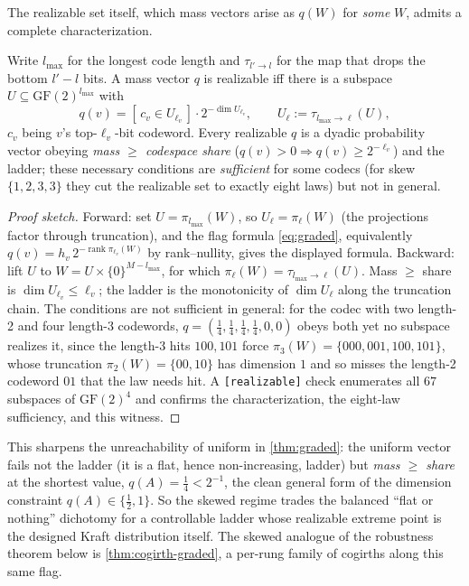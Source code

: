 \documentclass[acmsmall,review]{acmart}
\newcommand{\GF}{\mathrm{GF}(2)}
\DeclareMathOperator{\rank}{rank}
\newcommand{\W}{W}                          %
\newcommand{\proj}{\pi}                     %
\begin{document}
The realizable set itself, which mass vectors arise as $q(\W)$ for \emph{some} $\W$, admits
a complete characterization.

\begin{theorem}
\label{thm:realizable}
Write $l_{\max}$ for the longest code length and $\tau_{l' \to l}$ for the map that drops the
bottom $l' - l$ bits. A mass vector $q$ is realizable iff there is a subspace $U \subseteq
\GF^{l_{\max}}$ with
\[
  q(v) = [\, c_v \in U_{\ell_v} \,] \cdot 2^{-\dim U_{\ell_v}},
  \qquad U_\ell := \tau_{l_{\max} \to \ell}(U),
\]
$c_v$ being $v$'s top-$\ell_v$-bit codeword. Every realizable $q$ is a dyadic probability
vector obeying \emph{mass $\ge$ codespace share} ($q(v) > 0 \Rightarrow q(v) \ge 2^{-\ell_v}$)
and the ladder; these necessary conditions are \emph{sufficient} for some codecs (for skew
$\{1,2,3,3\}$ they cut the realizable set to exactly eight laws) but not in general.
\end{theorem}

\begin{proof}[Proof sketch]
Forward: set $U = \proj_{l_{\max}}(\W)$, so $U_\ell = \proj_\ell(\W)$ (the projections factor
through truncation), and the flag formula \eqref{eq:graded}, equivalently $q(v) = h_v\,
2^{-\rank \proj_{\ell_v}(\W)}$ by rank--nullity, gives the displayed formula.
Backward: lift $U$ to $\W = U \times \{0\}^{M - l_{\max}}$, for which $\proj_\ell(\W) =
\tau_{l_{\max} \to \ell}(U)$. Mass $\ge$ share is $\dim U_{\ell_v} \le \ell_v$; the ladder is
the monotonicity of $\dim U_\ell$ along the truncation chain. The conditions are not sufficient
in general: for the codec with two length-2 and four length-3 codewords,
$q = (\tfrac14,\tfrac14,\tfrac14,\tfrac14,0,0)$ obeys both yet no subspace realizes it, since the
length-3 hits $100, 101$ force $\proj_3(\W) = \{000,001,100,101\}$, whose truncation
$\proj_2(\W) = \{00,10\}$ has dimension $1$ and so misses the length-2 codeword $01$ that the law
needs hit. A \texttt{[realizable]} check enumerates all $67$ subspaces of $\GF^4$ and confirms the
characterization, the eight-law sufficiency, and this witness.
\end{proof}

This sharpens the unreachability of uniform in \cref{thm:graded}: the uniform vector fails not the
ladder (it is a flat, hence non-increasing, ladder) but \emph{mass $\ge$ share} at the shortest
value, $q(A) = \tfrac14 < 2^{-1}$, the clean general form of the dimension constraint $q(A) \in
\{\tfrac12, 1\}$. So the skewed regime trades the balanced ``flat or nothing'' dichotomy for a
controllable ladder whose realizable extreme point is the designed Kraft distribution itself. The
skewed analogue of the robustness theorem below is \cref{thm:cogirth-graded}, a per-rung family of
cogirths along this same flag.
\end{document}
